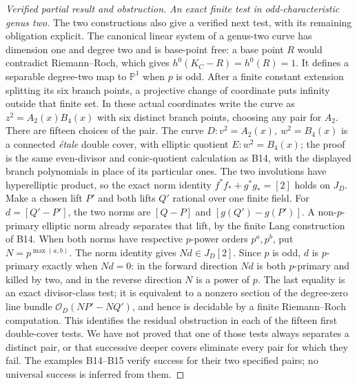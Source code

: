 \begin{proof}[Verified partial result and obstruction]
\emph{An exact finite test in odd-characteristic genus two.}
The two constructions also give a verified next test, with its
remaining obligation explicit. The canonical linear system of a
genus-two curve has dimension one and degree two and is base-point
free: a base point $R$ would contradict Riemann--Roch, which gives
$h^0(K_C-R)=h^0(R)=1$. It defines a separable degree-two map to
$\mathbb P^1$ when $p$ is odd. After a finite constant extension
splitting its six branch points, a projective change of coordinate
puts infinity outside that finite set. In these actual coordinates
write the curve as $z^2=A_2(x)B_4(x)$ with six distinct
branch points, choosing any pair for $A_2$. There are fifteen
choices of the pair. The curve
$D:v^2=A_2(x),\ w^2=B_4(x)$ is a connected \emph{\'etale}
double cover, with elliptic quotient $E:w^2=B_4(x)$; the proof is
the same even-divisor and conic-quotient calculation as B14, with
the displayed branch polynomials in place of its particular ones.
The two involutions have hyperelliptic product, so the exact norm
identity $f^*f_*+g^*g_*=[2]$ holds on $J_D$.
Make a chosen lift $P'$ and both lifts $Q'$ rational over one
finite field. For $d=[Q'-P']$, the two norms are
$[Q-P]$ and $[g(Q')-g(P')]$. A non-$p$-primary elliptic norm
already separates that lift, by the finite Lang construction of
B14. When both norms have respective $p$-power orders $p^a,p^b$,
put $N=p^{\max(a,b)}$. The norm identity gives $Nd\in J_D[2]$.
Since $p$ is odd, $d$ is $p$-primary exactly when $Nd=0$:
in the forward direction $Nd$ is both $p$-primary and killed by
two, and in the reverse direction $N$ is a power of $p$.
The last equality is an exact divisor-class test; it is equivalent
to a nonzero section of the degree-zero line bundle
$\mathcal O_D(NP'-NQ')$, and hence is decidable by a finite
Riemann--Roch computation. This identifies the residual obstruction
in each of the fifteen first double-cover tests. We have not proved
that one of those tests always separates a distinct pair, or that
successive deeper covers eliminate every pair for which they fail.
The examples B14--B15 verify success for their two specified pairs;
no universal success is inferred from them.


\end{proof}
